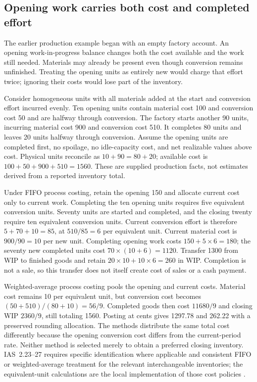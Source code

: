 \subsection{Opening work carries both cost and completed effort}
\label{sec:opening-production-cohorts}

The earlier production example began with an empty factory account. An opening
work-in-progress balance changes both the cost available and the work still
needed. Materials may already be present even though conversion remains
unfinished. Treating the opening units as entirely new would charge that
effort twice; ignoring their costs would lose part of the inventory.

Consider homogeneous units with all materials added at the start and
conversion effort incurred evenly. Ten opening units contain material
cost 100 and conversion cost 50 and are halfway through conversion.
The factory starts another 90 units, incurring material cost 900 and
conversion cost 510. It completes 80 units and leaves 20 units halfway
through conversion. Assume the opening units are completed first, no
spoilage, no idle-capacity cost, and net realizable values above cost.
Physical units reconcile as \(10+90=80+20\); available cost is
\(100+50+900+510=1560\). These are supplied production facts, not estimates
derived from a reported inventory total.

Under FIFO process costing, retain the opening 150 and allocate current
cost only to current work. Completing the ten opening units requires
five equivalent conversion units. Seventy units are started and completed,
and the closing twenty require ten equivalent conversion units. Current
conversion effort is therefore \(5+70+10=85\), at \(510/85=6\) per
equivalent unit. Current material cost is \(900/90=10\) per new unit.
Completing opening work costs \(150+5\times6=180\); the seventy new
completed units cost \(70\times(10+6)=1120\). Transfer 1300 from WIP
to finished goods and retain \(20\times10+10\times6=260\) in WIP.
Completion is not a sale, so this transfer does not itself create cost
of sales or a cash payment.

Weighted-average process costing pools the opening and current costs.
Material cost remains 10 per equivalent unit, but conversion cost becomes
\((50+510)/(80+10)=56/9\). Completed goods then cost \(11680/9\)
and closing WIP \(2360/9\), still totaling 1560. Posting at cents gives
1297.78 and 262.22 with a preserved rounding allocation. The methods
distribute the same total cost differently because the opening conversion
cost differs from the current-period rate. Neither method is selected
merely to obtain a preferred closing inventory. IAS~2.23--27 requires
specific identification where applicable and consistent FIFO or
weighted-average treatment for the relevant interchangeable inventories;
the equivalent-unit calculations are the local implementation of those
cost policies \citep[IAS~2.10--16, 23--27, 34]{eu20231803}.

